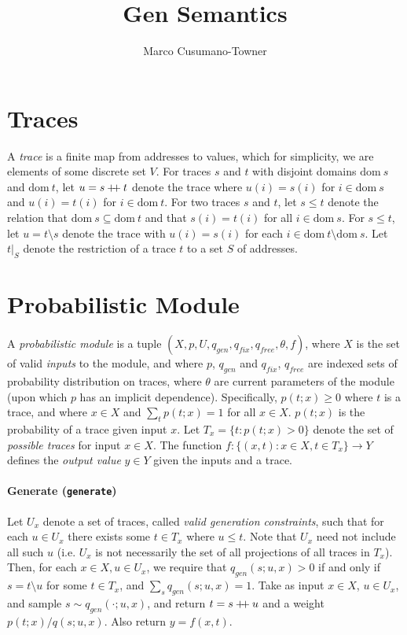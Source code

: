 \documentclass{article}
\title{Gen Semantics}
\author{Marco Cusumano-Towner}
\newcommand{\code}[1]{\texttt{\small{\textbf{#1}}}}
\newcommand\doubleplus{\mathbin{+\mkern-5mu+}}
\newcommand{\concat}[0]{\doubleplus}
\newcommand{\diff}[0]{\setminus}
\newcommand{\dom}[1]{\mbox{dom}{~#1}}
\begin{document}
\maketitle

\section{Traces}
A \emph{trace} is a finite map from addresses to values, which for simplicity, we are elements of some discrete set $V$.
For traces $s$ and $t$ with disjoint domains $\dom{s}$ and $\dom{t}$, let $u = s \concat t$ denote the trace where $u(i) = s(i)$ for $i \in \dom{s}$ and $u(i) = t(i)$ for $i \in \dom{t}$.
For two traces $s$ and $t$, let $s \le t$ denote the relation that $\dom{s} \subseteq \dom{t}$ and that $s(i) = t(i)$ for all $i \in \dom{s}$.
For $s \le t$, let $u = t \diff s$ denote the trace with $u(i) = s(i)$ for each $i \in \dom{t} \setminus \dom{s}$.
Let $t|_S$ denote the restriction of a trace $t$ to a set $S$ of addresses.

\section{Probabilistic Module}
A \emph{probabilistic module} is a tuple $(X, p, U, q_{gen}, q_{fix}, q_{free}, \theta, f)$, where $X$ is the set of valid \emph{inputs} to the module, and where $p$, $q_{gen}$ and $q_{fix}$, $q_{free}$ are indexed sets of probability distribution on traces, where $\theta$ are current parameters of the module (upon which $p$ has an implicit dependence).
Specifically, $p(t; x) \ge 0$ where $t$ is a trace, and where $x \in X$ and $\sum_t p(t; x) = 1$ for all $x \in X$.
$p(t; x)$ is the probability of a trace given input $x$.
Let $T_x = \{t : p(t; x) > 0 \}$ denote the set of \emph{possible traces} for input $x \in X$.
The function $f : \{(x, t) : x \in X, t \in T_x\} \to Y$ defines the \emph{output value} $y \in Y$ given the inputs and a trace.


\paragraph{Generate (\code{generate})}
Let $U_x$ denote a set of traces, called \emph{valid generation constraints}, such that for each $u \in U_x$ there exists some $t \in T_x$ where $u \le t$.
Note that $U_x$ need not include all such $u$ (i.e. $U_x$ is not necessarily the set of all projections of all traces in $T_x$).
Then, for each $x \in X, u \in U_x$, we require that $q_{gen}(s; u, x) > 0$ if and only if $s = t \diff u$ for some $t \in T_x$, and $\sum_s q_{gen}(s; u, x) = 1$.
Take as input $x \in X$, $u \in U_x$, and sample $s \sim q_{gen}(\cdot; u, x)$, and return $t = s \concat u$ and a weight $p(t; x) / q(s; u, x)$.
Also return $y = f(x, t)$.
\end{document}
